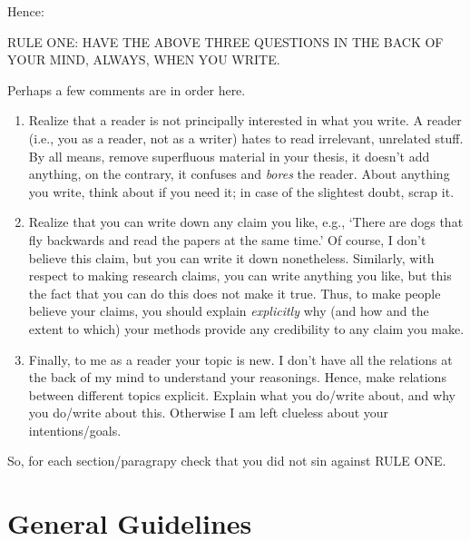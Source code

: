 \documentclass{article}
\begin{document}
Hence: 
\begin{center}
RULE ONE: HAVE THE ABOVE THREE QUESTIONS IN THE BACK OF YOUR MIND, ALWAYS, WHEN YOU WRITE.
\end{center}

Perhaps a few comments are in order here. 
\begin{enumerate}
\item Realize that a reader is not principally interested in what you
  write.  A reader (i.e., you as a reader, not as a writer) hates to
  read irrelevant, unrelated stuff. By all means, remove superfluous
  material in your thesis, it doesn't add anything, on the contrary,
  it confuses and \emph{bores} the reader. About anything you write,
  think about if you need it; in case of the slightest doubt, scrap
  it.
\item Realize that you can write down any claim you like, e.g., `There
  are dogs that fly backwards and read the papers at the same time.'
  Of course, I don't believe this claim, but you can write it down
  nonetheless. Similarly, with respect to making research claims, you
  can write anything you like, but this the fact that you can do this
  does not make it true. Thus, to make people believe your claims, you
  should explain \emph{explicitly} why (and how and the extent to
  which) your methods provide any credibility to any claim you make.
\item Finally, to me as a reader your topic is new. I don't have all
  the relations at the back of my mind to understand your
  reasonings. Hence, make relations between different topics
  explicit. Explain what you do/write about, and why you do/write about
  this. Otherwise I am left clueless about your intentions/goals.
\end{enumerate}

So, for each section/paragrapy check that you did not sin against RULE
ONE.


\section{General Guidelines}
\label{sec:most-important-rule}
\end{document}
